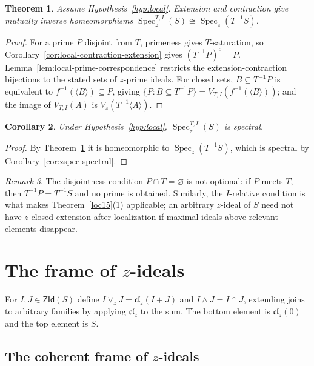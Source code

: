\documentclass[11pt,leqno]{amsart}
\theoremstyle{plain}
\newtheorem{theorem}{Theorem}[section]
\newtheorem{corollary}[theorem]{Corollary}
\theoremstyle{definition}
\theoremstyle{remark}
\newtheorem{remark}[theorem]{Remark}
\numberwithin{equation}{section}
\DeclareMathOperator{\Spec}{Spec}
\newcommand{\ZId}{\mathsf{ZId}}
\newcommand{\clz}{\mathfrak{cl}_{z}}
\begin{document}
\begin{theorem}\label{thm:local-z-spectrum-homeomorphism}
Assume Hypothesis~\ref{hyp:local}.
Extension and contraction give mutually inverse homeomorphisms
$\Spec_z^{T,I}(S)\cong\Spec_z(T^{-1}S)$.
\end{theorem}
\begin{proof}
For a prime $P$ disjoint from $T$, primeness gives $T$-saturation,
so Corollary~\ref{cor:local-contraction-extension} gives
$(T^{-1}P)^c=P$.
Lemma~\ref{lem:local-prime-correspondence} restricts the
extension-contraction bijections to the stated sets of $z$-prime ideals.
For closed sets, $B\subseteq T^{-1}P$ is equivalent to
$f^{-1}(\langle B\rangle)\subseteq P$, giving
$\{P:B\subseteq T^{-1}P\}=V_{T,I}(f^{-1}(\langle B\rangle))$;
and the image of $V_{T,I}(A)$ is $V_z(T^{-1}\langle A\rangle)$.
\end{proof}

\begin{corollary}\label{cor:local-relative-spectrum-spectral}
Under Hypothesis~\ref{hyp:local}, $\Spec_z^{T,I}(S)$ is spectral.
\end{corollary}
\begin{proof}
By Theorem~\ref{thm:local-z-spectrum-homeomorphism} it is homeomorphic
to $\Spec_z(T^{-1}S)$, which is spectral by Corollary~\ref{cor:zspec-spectral}.
\end{proof}

\begin{remark}\label{rem:local-topological-hypotheses}
The disjointness condition $P\cap T=\varnothing$ is not optional:
if $P$ meets $T$, then $T^{-1}P=T^{-1}S$ and no prime is obtained.
Similarly, the $I$-relative condition is what makes
Theorem~\ref{loc15}(1) applicable; an arbitrary $z$-ideal of $S$
need not have $z$-closed extension after localization if maximal
ideals above relevant elements disappear.
\end{remark}

\section{The frame of \texorpdfstring{$z$}{z}-ideals}
\label{sec:frame}

For $I,J\in\ZId(S)$ define
$I\vee_z J=\clz(I+J)$ and $I\wedge J=I\cap J$,
extending joins to arbitrary families by applying $\clz$ to the sum.
The bottom element is $\clz(0)$ and the top element is $S$.

\subsection{The coherent frame of
\texorpdfstring{$z$}{z}-ideals}
\end{document}
